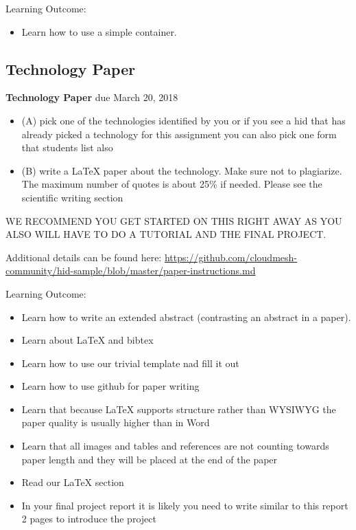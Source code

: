 Learning Outcome:

\begin{itemize}
\item Learn how to use a simple container. 
\end{itemize}

\subsection{Technology Paper}
\label{E:616-tech-paper}

\begin{exercise} {\bf Technology Paper} due March 20, 2018

\begin{itemize}
Read the following two points to assist you in starting your paper 
\item (A) pick one of the technologies identified by you or if you see a
  hid that has already picked a technology for this assignment you can
  also pick one form that students list also

\item (B) write a LaTeX paper about the technology. Make sure not to
  plagiarize. The maximum number of quotes is about 25\% if
  needed. Please see the scientific writing section

\end{itemize}
 WE RECOMMEND YOU GET STARTED ON THIS RIGHT AWAY AS YOU ALSO WILL HAVE
 TO DO A TUTORIAL AND THE FINAL PROJECT.

Additional details can be found here:
\url{https://github.com/cloudmesh-community/hid-sample/blob/master/paper-instructions.md}

\end{exercise}


Learning Outcome:
\begin{itemize}
\item Learn how to write an extended abstract (contrasting an abstract
  in a paper).
\item Learn about LaTeX and bibtex
\item Learn how to use our trivial template nad fill it out
\item Learn how to use github for paper writing
\item Learn that because LaTeX supports structure rather than WYSIWYG
  the paper quality is usually higher than in Word
\item Learn that all images and tables and references are not counting
  towards paper length and they will be placed at the end of the paper
\item Read our LaTeX section
\item In your final project report it is likely you need to write
  similar to this report 2 pages to introduce the project

\end{itemize}


